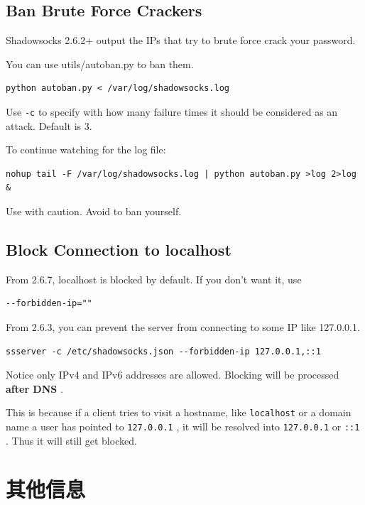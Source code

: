\documentclass[11pt,a4paper]{sphinxmanual}
\begin{document}
\label{sec:ban_brute_force_crackers}
\section{Ban Brute Force Crackers}
\label{sec-6-10}
Shadowsocks 2.6.2+ output the IPs that try to brute force crack your password.

You can use utils/autoban.py to ban them.
\begin{Verbatim}
python autoban.py < /var/log/shadowsocks.log
\end{Verbatim}

Use \verb~-c~ to specify with how many failure times it should be considered as an attack. Default is 3.

To continue watching for the log file:

\begin{Verbatim}
nohup tail -F /var/log/shadowsocks.log | python autoban.py >log 2>log &
\end{Verbatim}

Use with caution. Avoid to ban yourself.



\label{sec:block_connection_to_localhost}
\section{Block Connection to localhost}
\label{sec-6-11}
From 2.6.7, localhost is blocked by default. If you don't want it, use 
\begin{Verbatim}
--forbidden-ip=""
\end{Verbatim}

From 2.6.3, you can prevent the server from connecting to some IP like 127.0.0.1.

\begin{Verbatim}
ssserver -c /etc/shadowsocks.json --forbidden-ip 127.0.0.1,::1
\end{Verbatim}

Notice only IPv4 and IPv6 addresses are allowed. Blocking will be processed \textbf{after DNS} .

This is because if a client tries to visit a hostname, like \verb~localhost~ or a domain name a user has pointed to \verb~127.0.0.1~ , it will be resolved into \verb~127.0.0.1~ or \verb~::1~ . Thus it will still get blocked.


\chapter{其他信息}
\label{sec-7}
\end{document}
